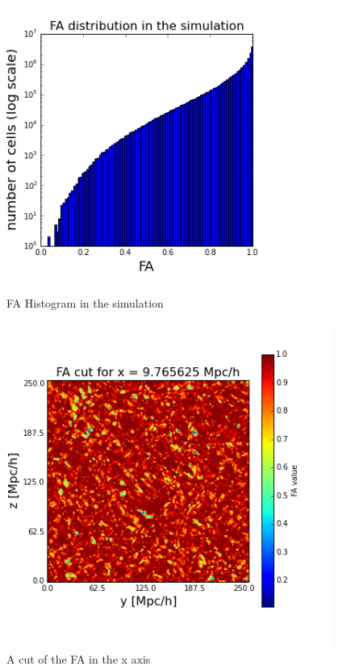 \documentclass[12pt]{article}
\begin{document}
\begin{figure}[ht]
\centering
\begin{minipage}{.5\textwidth}
  \centering
  \includegraphics[width=0.8\textwidth]{simulation/FA_hist_sim.png}
  \caption{FA Histogram in the simulation}
\label{fg:hist_FA}
\end{minipage}%
\begin{minipage}{.5\textwidth}
  \centering
  \includegraphics[width=0.95\textwidth]{simulation/FA_cut_i_10.png}
  \caption{A cut of the FA in the x axis}
\label{fg:cut_FA}
\end{minipage}
\end{figure}
\FloatBarrier
\end{document}
